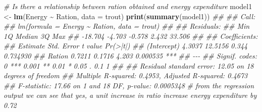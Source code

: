 \documentclass[
]{book}
\newenvironment{Shaded}{\begin{snugshade}}{\end{snugshade}}
\newcommand{\CommentTok}[1]{\textcolor[rgb]{0.56,0.35,0.01}{\textit{#1}}}
\newcommand{\DataTypeTok}[1]{\textcolor[rgb]{0.13,0.29,0.53}{#1}}
\newcommand{\KeywordTok}[1]{\textcolor[rgb]{0.13,0.29,0.53}{\textbf{#1}}}
\newcommand{\NormalTok}[1]{#1}
\newcommand{\OperatorTok}[1]{\textcolor[rgb]{0.81,0.36,0.00}{\textbf{#1}}}
\newcommand{\StringTok}[1]{\textcolor[rgb]{0.31,0.60,0.02}{#1}}
\theoremstyle{definition}
\theoremstyle{definition}
\theoremstyle{definition}
\theoremstyle{remark}
\begin{document}
\begin{Shaded}
\begin{Highlighting}[]
\CommentTok{\# Is there a relationship between ration obtained and energy expenditure}
\NormalTok{model1 \textless{}{-}}\StringTok{ }\KeywordTok{lm}\NormalTok{(Energy }\OperatorTok{\textasciitilde{}}\StringTok{ }\NormalTok{Ration, }\DataTypeTok{data =}\NormalTok{ trout)}
\KeywordTok{print}\NormalTok{(}\KeywordTok{summary}\NormalTok{(model1))}
\CommentTok{\#\# }
\CommentTok{\#\# Call:}
\CommentTok{\#\# lm(formula = Energy \textasciitilde{} Ration, data = trout)}
\CommentTok{\#\# }
\CommentTok{\#\# Residuals:}
\CommentTok{\#\#     Min      1Q  Median      3Q     Max }
\CommentTok{\#\# {-}18.704  {-}4.703  {-}0.578   2.432  33.506 }
\CommentTok{\#\# }
\CommentTok{\#\# Coefficients:}
\CommentTok{\#\#             Estimate Std. Error t value Pr(\textgreater{}|t|)    }
\CommentTok{\#\# (Intercept)   4.3037    12.5156   0.344 0.734930    }
\CommentTok{\#\# Ration        0.7211     0.1716   4.203 0.000535 ***}
\CommentTok{\#\# {-}{-}{-}}
\CommentTok{\#\# Signif. codes:  0 \textquotesingle{}***\textquotesingle{} 0.001 \textquotesingle{}**\textquotesingle{} 0.01 \textquotesingle{}*\textquotesingle{} 0.05 \textquotesingle{}.\textquotesingle{} 0.1 \textquotesingle{} \textquotesingle{} 1}
\CommentTok{\#\# }
\CommentTok{\#\# Residual standard error: 12.05 on 18 degrees of freedom}
\CommentTok{\#\# Multiple R{-}squared:  0.4953,	Adjusted R{-}squared:  0.4673 }
\CommentTok{\#\# F{-}statistic: 17.66 on 1 and 18 DF,  p{-}value: 0.0005348}
\CommentTok{\# from the regression output we can see that yes, a unit increase in ratio increase energy expenditure by 0.72}


\end{Highlighting}
\end{Shaded}
\end{document}
